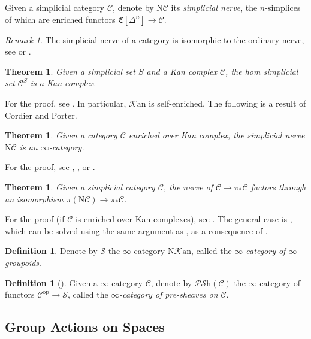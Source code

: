 \documentclass[a4paper]{book}
\newcommand{\lC}{\mathcal{C}}
\newcommand{\kC}{\mathfrak{C}}
\newcommand{\lK}{\mathcal{K}}
\newcommand{\mN}{\mathrm{N}}
\newcommand{\lP}{\mathcal{P}}
\newcommand{\lS}{\mathcal{S}}
\newcommand{\op}{\mathrm{op}}
\newcommand{\Psh}{\lP\Shv} %
\newcommand{\Shv}{\lS\mathrm{h}} %
\newcommand{\Kan}{\lK\mathrm{an}} %
\newtheorem{theorem}[equation]{Theorem}
\theoremstyle{definition}
\newtheorem{definition}[equation]{Definition}
\theoremstyle{remark}
\newtheorem{remark}[equation]{Remark}
\numberwithin{equation}{section}
\begin{document}
Given a simplicial category $\lC$, denote by $\mN\lC$ its \emph{simplicial nerve}, the $n$-simplices of which are enriched functors $\kC[\Delta^n]\to\lC$. 
\begin{remark}
	The simplicial nerve of a category is isomorphic to the ordinary nerve, see \cite[Tag 00KZ]{kerodon2026} or \cite[Lemma 1.2.64]{land2021introduction}.
\end{remark}
\begin{theorem} Given a simplicial set $S$ and a Kan complex $\lC$, the hom simplicial set $\lC^S$ is a Kan complex. 
\end{theorem}For the proof, see {\cite[Corollary 1.3.38]{land2021introduction}}. In particular, $\Kan$ is self-enriched. The following is a result of Cordier and Porter.
\begin{theorem}
	Given a category $\lC$ enriched over Kan complex, the simplicial nerve $\mN\lC$ is an $\infty$-category. 
\end{theorem}
For the proof, see \cite[Lemma 1.2.70]{land2021introduction}, \cite[Proposition 1.1.5.10]{lurie2009htt}, or \cite[Tag 00LJ]{kerodon2026}.
\begin{theorem}
	Given a simplicial category $\lC$, the nerve of $\lC\to\pi_*\lC$ factors through an isomorphism $\pi(\mN\lC)\to\pi_*\lC$.
\end{theorem}For the proof (if $\lC$ is enriched over Kan complexes), see {\cite[Tag 00M4]{kerodon2026}}. The general case is \cite[Exercise 50]{land2021introduction}, which can be solved using the same argument as \cite[Tag 00M4]{kerodon2026}, as a consequence of \cite[Observation 1.2.8 and Lemma 1.2.70]{land2021introduction}. 
\begin{definition}
	Denote by $\lS$ the $\infty$-category $\mN\Kan$, called the \emph{$\infty$-category of $\infty$-groupoids}.
\end{definition}
\begin{definition}[{\cite[Definition 5.1.0.1]{lurie2009htt}}]
	Given a $\infty$-category $\lC$, denote by $\Psh(\lC)$ the $\infty$-category of functors $\lC^\op\to\lS$, called the \emph{$\infty$-category of pre-sheaves on $\lC$}. 
\end{definition}


\subsection{Group Actions on Spaces}
\end{document}
